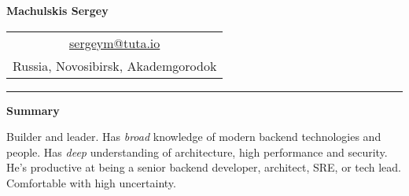 \documentclass[final]{letter}
\begin{document}
\begin{center}

{\fontsize{25}{40}\selectfont\bf{Machulskis Sergey}}
  {\hfill
    \begin{tabular}{c}
        \href{mailto:sergeym@tuta.io}{sergeym@tuta.io}\\
        Russia, Novosibirsk, Akademgorodok
     \end{tabular}
  }
\rule{.98\textwidth}{1pt}

\addvspace{.1cm}

\end{center}
{\bf Summary}

Builder and leader. Has \textit{broad} knowledge of modern backend technologies and people. Has \textit{deep} understanding of architecture, high performance and security.
He's productive at being a senior backend developer, architect, SRE, or tech lead. Comfortable with high uncertainty.
\end{document}

